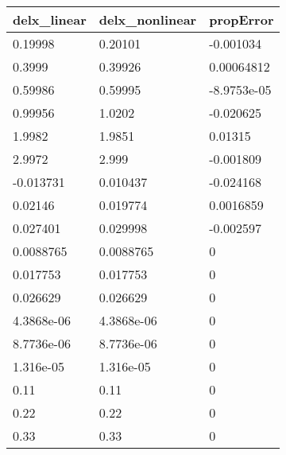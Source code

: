 \begin{tabular}{lll}
delx_linear & delx_nonlinear & propError \\ 
\hline 
0.19998 & 0.20101 & -0.001034 \\ 
0.3999 & 0.39926 & 0.00064812 \\ 
0.59986 & 0.59995 & -8.9753e-05 \\ 
0.99956 & 1.0202 & -0.020625 \\ 
1.9982 & 1.9851 & 0.01315 \\ 
2.9972 & 2.999 & -0.001809 \\ 
-0.013731 & 0.010437 & -0.024168 \\ 
0.02146 & 0.019774 & 0.0016859 \\ 
0.027401 & 0.029998 & -0.002597 \\ 
0.0088765 & 0.0088765 & 0 \\ 
0.017753 & 0.017753 & 0 \\ 
0.026629 & 0.026629 & 0 \\ 
4.3868e-06 & 4.3868e-06 & 0 \\ 
8.7736e-06 & 8.7736e-06 & 0 \\ 
1.316e-05 & 1.316e-05 & 0 \\ 
0.11 & 0.11 & 0 \\ 
0.22 & 0.22 & 0 \\ 
0.33 & 0.33 & 0 \\ 
\hline 
\end{tabular}